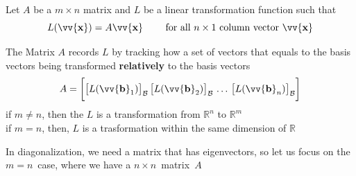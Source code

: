 \documentclass[11pt]{article}
\DeclareRobustCommand{\myvec}[1]{\vv{\mathbf{#1}}}
\newcommand{\myset}[1]{\mathcal{#1}}
\newcommand{\mymat}[1]{#1}
\begin{document}
    Let $\mymat{A}$ be a $m \times n$ matrix and $L$ be a linear transformation function such that
    \[ \mymat{L}(\myvec{x}) = \mymat{A}\myvec{x} \qquad \text{ for all }n \times 1\text{ column vector }\myvec{x} \]
    
    The Matrix $\mymat{A}$ records $\mymat{L}$ by tracking how a set of vectors that equals to the basis vectors being transformed \textbf{relatively} to the basis vectors \\
    
    \begin{equation}
        \mymat{A} = \bigg[ \big[\mymat{L}(\myvec{b}_1)\big]_{\myset{B}} \, \big[\mymat{L}(\myvec{b}_2)\big]_{\myset{B}} \, \dots \, \big[\mymat{L}(\myvec{b}_n)\big]_{\myset{B}} \bigg]
    \end{equation}
    if $m \ne n$, then the $\mymat{L}$ is a transformation from $\mathbb{R}^n$ to $\mathbb{R}^m$\\
    if $m = n$, then, $\mymat{L}$ is a trasformation within the same dimension of $\mathbb{R}$
    \vspace{1ex}

    In diagonalization, we need a matrix that has eigenvectors, so let us focus on the $m = n$~case, where we have a $n \times n$~matrix~$\mymat{A}$
\end{document}
